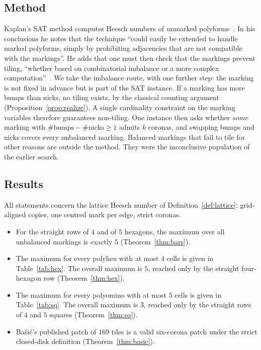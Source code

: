 \documentclass[11pt]{amsart}
\theoremstyle{definition}
\theoremstyle{remark}
\begin{document}
\subsection*{Method}
Kaplan's SAT method computes Heesch numbers of unmarked polyforms~\cite{Kaplan2022}. In his conclusions he notes that the technique ``could easily be extended to handle marked polyforms, simply by prohibiting adjacencies that are not compatible with the markings''. He adds that one must then check that the markings prevent tiling, ``whether based on combinatorial imbalance or a more complex computation''~\cite{Kaplan2022}. We take the imbalance route, with one further step: the marking is not fixed in advance but is part of the SAT instance. If a marking has more bumps than nicks, no tiling exists, by the classical counting argument (Proposition~\ref{prop:realize}). A single cardinality constraint on the marking variables therefore guarantees non-tiling. One instance then asks whether \emph{some} marking with $\#\text{bumps}-\#\text{nicks}\ge1$ admits $k$ coronas, and swapping bumps and nicks covers every unbalanced marking. Balanced markings that fail to tile for other reasons are outside the method. They were the inconclusive population of the earlier search.

\subsection*{Results}
All statements concern the lattice Heesch number of Definition~\ref{def:lattice}: grid-aligned copies, one centred mark per edge, strict coronas.
\begin{itemize}
\item[(A)] For the straight rows of $4$ and of $5$ hexagons, the maximum over all unbalanced markings is exactly $5$ (Theorem~\ref{thm:bars}).
\item[(B)] The maximum for every polyhex with at most $4$ cells is given in Table~\ref{tab:hex}. The overall maximum is $5$, reached only by the straight four-hexagon row (Theorem~\ref{thm:hex}).
\item[(C)] The maximum for every polyomino with at most $5$ cells is given in Table~\ref{tab:sq}. The overall maximum is $3$, reached only by the straight rows of $4$ and $5$ squares (Theorem~\ref{thm:sq}).
\item[(D)] Ba\v{s}i\'c's published patch of $169$ tiles is a valid six-corona patch under the strict closed-disk definition (Theorem~\ref{thm:basic}).
\end{itemize}
\end{document}

